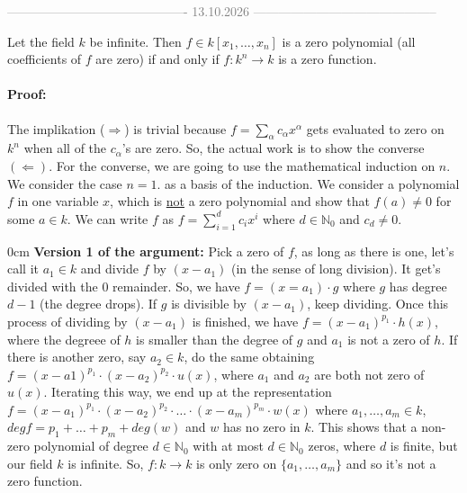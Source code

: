   \begin{center}
    \textcolor{gray}{------------------------------------------- 13.10.2026 --------------------------------------------} \\[0.3em]
  \end{center} 
  \vspace{0.5cm}
\begin{theorem}[title =Theorem 1.1.8]
  Let the field $k$ be infinite. Then $f \in k[x_1, \dots, x_n]$ is a zero polynomial (all coefficients of $f$ are zero) if and only if $f: k^n \to k$ is a zero function. 
  
  \paragraph{Proof:} The implikation ($\Rightarrow$) is trivial because $f = \sum_{\alpha} c_{\alpha} x^{\alpha}$ gets evaluated to zero on $k^n$ when all of the $c_{\alpha}$'s are zero. 
  So, the actual work is to show the converse $(\Leftarrow)$. For the converse, we are going to use the mathematical induction on $n$. \\
  
  We consider the case $n = 1$. as a basis of the induction. We consider a polynomial $f$ in one variable $x$, which is \underline{not} a zero polynomial 
  and show that $f(a) \neq 0$ for some $a \in k$. We can write $f$ as $f = \sum_{i=1}^{d} c_i x^i$ where $d \in \mathbb{N}_0$ and $c_d \neq 0$.  \\
  
  \begin{addmargin}[0.6cm]{0cm}  
    \textbf{Version 1 of the argument:} \hspace*{0.2cm} Pick a zero of $f$, as long as there is one, let's call it $a_1 \in k$ and divide $f$ by $(x - a_1)$ (in the sense of long division). 
    It get's divided with the 0 remainder. So, we have $f = (x = a_1) \cdot g$ where $g$ has degree $d-1$ (the degree drops). If $g$ is divisible by $(x - a_1)$, keep dividing. 
    Once this process of dividing by $(x - a_1)$ is finished, we have $f = (x - a_1)^{p_1} \cdot h(x)$, where the degreee of $h$ is smaller than the degree of $g$ and $a_1$ is not a zero of $h$. 
    If there is another zero, say $a_2 \in k$, do the same obtaining  $f = (x - a1)^{p_1} \cdot (x - a_2)^{p_2} \cdot u(x)$, where $a_1$ and $a_2$ are both not zero of $u(x)$. 
    Iterating this way, we end up at the representation $f = (x - a_1)^{p_1} \cdot (x - a_2)^{p_2} \cdot \dots \cdot (x - a_m)^{p_m} \cdot w(x)$ where $a_1, \ldots, a_m \in k$, $deg f = p_1 + \ldots + p_m + deg(w)$ 
    and $w$ has no zero in $k$. This shows that a non-zero polynomial of degree $d \in \mathbb{N}_0$ with at most $d \in \mathbb{N}_0$ zeros, where $d$ is finite, but 
    our field $k$ is infinite. So, $f : k \to k$ is only zero on $\{a_1, \ldots, a_m\}$ and so it's not a zero function.
  \end{addmargin}


\end{theorem}
